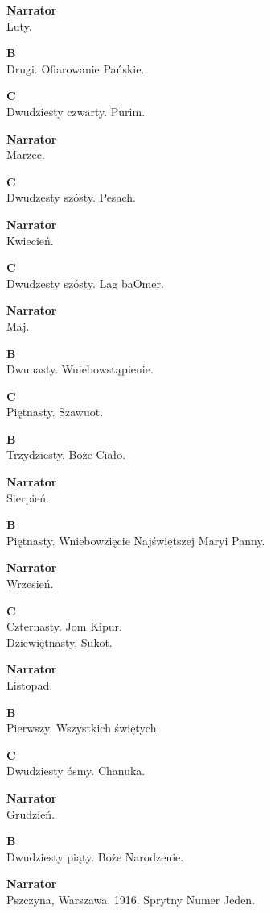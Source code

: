 \documentclass[11pt,a4paper,oneside]{article}
\begin{document}
\textbf{Narrator}\\
Luty.

\textbf{B}\\
Drugi. Ofiarowanie Pańskie.

\textbf{C}\\
Dwudziesty czwarty. Purim.

\textbf{Narrator}\\
Marzec.

\textbf{C}\\
Dwudzesty szósty. Pesach.

\textbf{Narrator}\\
Kwiecień.

\textbf{C}\\
Dwudzesty szósty. Lag baOmer.

\textbf{Narrator}\\
Maj.

\textbf{B}\\
Dwunasty. Wniebowstąpienie.

\textbf{C}\\
Piętnasty. Szawuot.

\textbf{B}\\
Trzydziesty. Boże Ciało.

\textbf{Narrator}\\
Sierpień.

\textbf{B}\\
Piętnasty. Wniebowzięcie Najświętszej Maryi Panny.

\textbf{Narrator}\\
Wrzesień.

\textbf{C}\\
Czternasty. Jom Kipur.\\
Dziewiętnasty. Sukot.

\textbf{Narrator}\\
Listopad.

\textbf{B}\\
Pierwszy. Wszystkich świętych.

\textbf{C}\\
Dwudziesty ósmy. Chanuka.

\textbf{Narrator}\\
Grudzień.

\textbf{B}\\
Dwudziesty piąty. Boże Narodzenie.



\textbf{Narrator}\\
Pszczyna, Warszawa. 1916. Sprytny Numer Jeden. 
\end{document}
